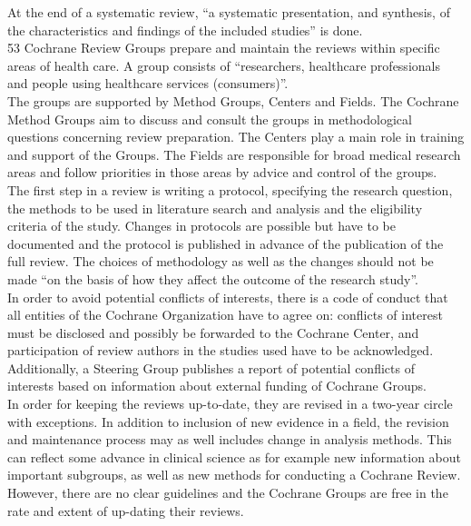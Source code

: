 At the end of a systematic review, ``a systematic presentation, and synthesis, of the characteristics and findings of the included studies'' is done. \\
53 Cochrane Review Groups prepare and maintain the reviews within specific areas of health care. A group consists of ``researchers, healthcare professionals and people using healthcare services (consumers)''. \\
The groups are supported by Method Groups, Centers and Fields. The Cochrane Method Groups aim to discuss and consult the groups in methodological questions concerning review preparation. The Centers play a main role in training and support of the Groups. The Fields are responsible for broad medical research areas and follow priorities in those areas by advice and control of the groups. \\
The first step in a review is writing a protocol, specifying the research question, the methods to be used in literature search and analysis and the eligibility criteria of the study. Changes in protocols are possible but have to be documented and the protocol is published in advance of the publication of the full review. The choices of methodology as well as the changes should not be made ``on the basis of how they affect the outcome of the research study''. \\
In order to avoid potential conflicts of interests, there is a code of conduct that all entities of the Cochrane Organization have to agree on: conflicts of interest must be disclosed and possibly be forwarded to the Cochrane Center, and participation of review authors in the studies used have to be acknowledged. Additionally, a Steering Group publishes a report of potential conflicts of interests based on information about external funding of Cochrane Groups. \\
In order for keeping the reviews up-to-date, they are revised in a two-year circle with exceptions. In addition to inclusion of new evidence in a field, the revision and maintenance process may as well includes change in analysis methods. This can reflect some advance in clinical science as for example new information about important subgroups, as well as new methods for conducting a Cochrane Review. However, there are no clear guidelines and the Cochrane Groups are free in the rate and extent of up-dating their reviews.


